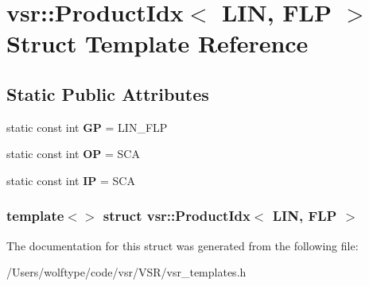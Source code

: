 \hypertarget{structvsr_1_1_product_idx_3_01_l_i_n_00_01_f_l_p_01_4}{\section{vsr\-:\-:Product\-Idx$<$ L\-I\-N, F\-L\-P $>$ Struct Template Reference}
\label{structvsr_1_1_product_idx_3_01_l_i_n_00_01_f_l_p_01_4}
}
\subsection*{Static Public Attributes}
\begin{DoxyCompactItemize}
\item 
\hypertarget{structvsr_1_1_product_idx_3_01_l_i_n_00_01_f_l_p_01_4_a2263007ebc4897e3ab829b5326e69b7e}{static const int {\bfseries G\-P} = L\-I\-N\-\_\-\-F\-L\-P}\label{structvsr_1_1_product_idx_3_01_l_i_n_00_01_f_l_p_01_4_a2263007ebc4897e3ab829b5326e69b7e}

\item 
\hypertarget{structvsr_1_1_product_idx_3_01_l_i_n_00_01_f_l_p_01_4_a956024369c9f9f32a62c952129d2e554}{static const int {\bfseries O\-P} = S\-C\-A}\label{structvsr_1_1_product_idx_3_01_l_i_n_00_01_f_l_p_01_4_a956024369c9f9f32a62c952129d2e554}

\item 
\hypertarget{structvsr_1_1_product_idx_3_01_l_i_n_00_01_f_l_p_01_4_a8f6a83b49644ad6b0df24d7105137e5c}{static const int {\bfseries I\-P} = S\-C\-A}\label{structvsr_1_1_product_idx_3_01_l_i_n_00_01_f_l_p_01_4_a8f6a83b49644ad6b0df24d7105137e5c}

\end{DoxyCompactItemize}
\subsubsection*{template$<$$>$ struct vsr\-::\-Product\-Idx$<$ L\-I\-N, F\-L\-P $>$}



The documentation for this struct was generated from the following file\-:\begin{DoxyCompactItemize}
\item 
/\-Users/wolftype/code/vsr/\-V\-S\-R/vsr\-\_\-templates.\-h\end{DoxyCompactItemize}
